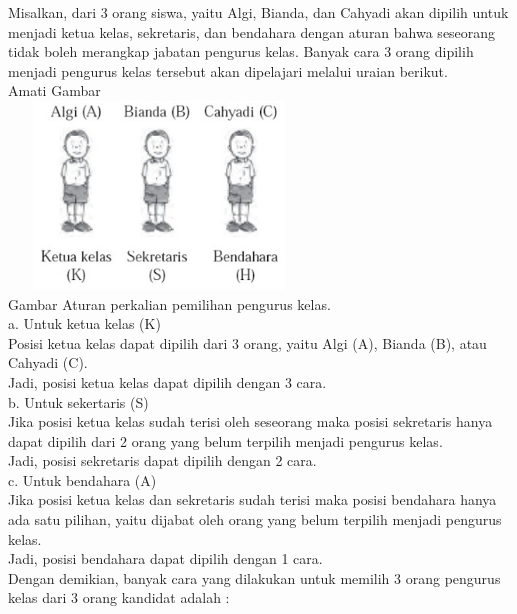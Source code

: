 \documentclass[11pt,fleqn]{book} %
\begin{document}
 Misalkan, dari 3 orang siswa, yaitu Algi, Bianda, dan Cahyadi akan dipilih untuk menjadi ketua kelas, sekretaris, dan bendahara dengan aturan bahwa seseorang tidak boleh merangkap jabatan pengurus kelas. Banyak cara 3 orang dipilih menjadi pengurus kelas tersebut akan dipelajari melalui uraian berikut.\\
  Amati Gambar\\
 
 \includegraphics[width = 8cm, height= 5cm]{Pictures/gen1.png}\\
Gambar  Aturan perkalian pemilihan pengurus kelas.\\

a. Untuk ketua kelas (K)\\
 Posisi ketua kelas dapat dipilih dari 3 orang, yaitu Algi  (A), Bianda (B), atau Cahyadi (C).\\

 Jadi, posisi ketua kelas dapat dipilih dengan 3 cara.\\
 
b. Untuk sekertaris (S)\\
 Jika posisi ketua kelas sudah terisi oleh seseorang maka  posisi sekretaris hanya dapat dipilih dari 2 orang yang belum terpilih menjadi pengurus kelas.\\ 

 Jadi, posisi sekretaris dapat dipilih dengan 2 cara.\\
 
c. Untuk bendahara (A)\\
Jika posisi ketua kelas dan sekretaris sudah terisi maka posisi bendahara hanya ada satu pilihan, yaitu dijabat oleh orang yang belum terpilih menjadi pengurus kelas.\\

Jadi, posisi bendahara dapat dipilih dengan 1 cara.\\

Dengan demikian, banyak cara yang dilakukan untuk memilih 3 orang pengurus kelas dari 3 orang kandidat adalah :\\
\end{document}
